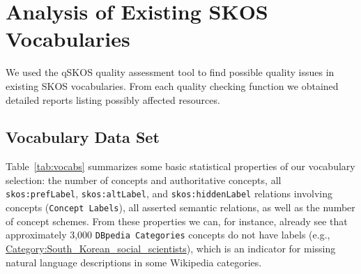
\section{Analysis of Existing SKOS Vocabularies}\label{sec:analysis}

We used the qSKOS quality assessment tool to find possible quality issues in existing SKOS vocabularies. From each quality checking function we obtained detailed reports listing possibly affected resources.

\subsection{Vocabulary Data Set}

Table~\ref{tab:vocabs} summarizes some basic statistical properties of our vocabulary selection: the number of concepts and authoritative concepts, all \texttt{skos:prefLabel}, \texttt{skos:altLabel}, and \texttt{skos:hiddenLabel} relations involving concepts (\texttt{Concept Labels}), all asserted semantic relations, as well as the number of concept schemes. From these properties we can, for instance, already see that approximately 3,000 \texttt{DBpedia Categories} concepts do not have labels (e.g., \url{Category:South_Korean_social_scientists}), which is an indicator for missing natural language descriptions in some Wikipedia categories. 

